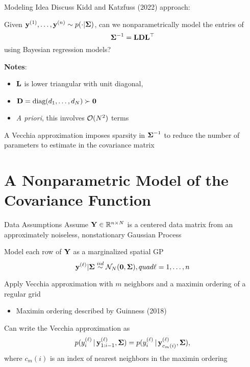 \documentclass[letterpaper, 10pt, compress]{beamer}
\begin{document}
\begin{frame}{Modeling Idea}
    Discuss Kidd and Katzfuss (2022) \cite{kidd-katzfuss2021} approach:
    \medskip\par
    
    Given $\mathbf{y}^{(1)}, \dots, \mathbf{y}^{(n)} \sim p(\cdot | \boldsymbol{\Sigma})$, can we
    nonparametrically model the entries of
    \[
        \boldsymbol{\Sigma}^{-1} = \mathbf{L} \mathbf{D} \mathbf{L}^{\top}
    \]
    using Bayesian regression models?
    \medskip\par
    \textbf{Notes}:
    \begin{itemize}
        \item $\mathbf{L}$ is lower triangular with unit diagonal,
        \item $\mathbf{D} = \text{diag}(d_1, \dots, d_N) \succ \mathbf{0}$
        \item \emph{A priori}, this involves $\mathcal{O}(N^2)$ terms
    \end{itemize}
    
    A Vecchia approximation imposes sparsity in $\boldsymbol{\Sigma}^{-1}$ to reduce the
    number of parameters to estimate in the covariance matrix
\end{frame}


\section[Stat Model]{A Nonparametric Model of the Covariance Function}

\begin{frame}{Data Assumptions}
    Assume $\mathbf{Y} \in \mathbb{R}^{n \times N}$ is a centered data matrix from an approximately
    noiseless, nonstationary Gaussian Process
    \medskip\par
    
    Model each row of $\mathbf{Y}$ as a marginalized spatial GP
    \[
        \mathbf{y}^{(\ell)} | \boldsymbol{\Sigma} \overset{iid}{\sim} \mathcal{N}_N(\mathbf{0}, \boldsymbol{\Sigma}),
        quad \ell = 1, \dots, n
    \]

    Apply Vecchia approximation with $m$ neighbors and a maximin ordering of a
    regular grid
    \begin{itemize}
        \item Maximin ordering described by Guinness (2018) \cite{Guinness2018}
    \end{itemize}

    Can write the Vecchia approximation as
    \[
        p(y_i^{(\ell)}\, |\, \mathbf{y}_{1:i-1}^{(\ell)}, \boldsymbol{\Sigma}) =
        p(y_i^{(\ell)}\, |\, \mathbf{y}_{c_m(i)}^{(\ell)}, \boldsymbol{\Sigma}),
    \]
    where $c_m(i)$ is an index of nearest neighbors in the maximin ordering
\end{frame}
\end{document}
